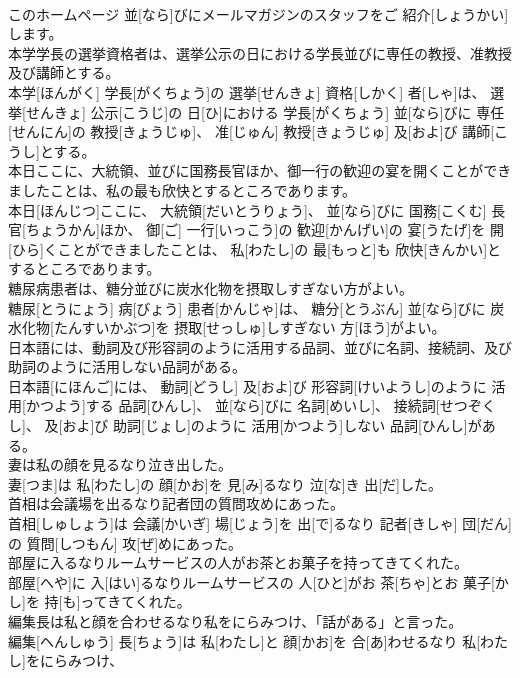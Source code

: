 \documentclass[8pt]{extreport}
\begin{document}
\begin{CJK}{UTF8}{min}
\\	このホームページ 並[なら]びにメールマガジンのスタッフをご 紹介[しょうかい]します。
\\	本学学長の選挙資格者は、選挙公示の日における学長並びに専任の教授、准教授及び講師とする。	
\\	本学[ほんがく] 学長[がくちょう]の 選挙[せんきょ] 資格[しかく] 者[しゃ]は、 選挙[せんきょ] 公示[こうじ]の 日[ひ]における 学長[がくちょう] 並[なら]びに 専任[せんにん]の 教授[きょうじゅ]、 准[じゅん] 教授[きょうじゅ] 及[およ]び 講師[こうし]とする。
\\	本日ここに、大統領、並びに国務長官ほか、御一行の歓迎の宴を開くことができましたことは、私の最も欣快とするところであります。	
\\	本日[ほんじつ]ここに、 大統領[だいとうりょう]、 並[なら]びに 国務[こくむ] 長官[ちょうかん]ほか、 御[ご] 一行[いっこう]の 歓迎[かんげい]の 宴[うたげ]を 開[ひら]くことができましたことは、 私[わたし]の 最[もっと]も 欣快[きんかい]とするところであります。
\\	糖尿病患者は、糖分並びに炭水化物を摂取しすぎない方がよい。	
\\	糖尿[とうにょう] 病[びょう] 患者[かんじゃ]は、 糖分[とうぶん] 並[なら]びに 炭水化物[たんすいかぶつ]を 摂取[せっしゅ]しすぎない 方[ほう]がよい。
\\	日本語には、動詞及び形容詞のように活用する品詞、並びに名詞、接続詞、及び助詞のように活用しない品詞がある。	
\\	日本語[にほんご]には、 動詞[どうし] 及[およ]び 形容詞[けいようし]のように 活用[かつよう]する 品詞[ひんし]、 並[なら]びに 名詞[めいし]、 接続詞[せつぞくし]、 及[およ]び 助詞[じょし]のように 活用[かつよう]しない 品詞[ひんし]がある。
\\	妻は私の顔を見るなり泣き出した。	
\\	妻[つま]は 私[わたし]の 顔[かお]を 見[み]るなり 泣[な]き 出[だ]した。
\\	首相は会議場を出るなり記者団の質問攻めにあった。	
\\	首相[しゅしょう]は 会議[かいぎ] 場[じょう]を 出[で]るなり 記者[きしゃ] 団[だん]の 質問[しつもん] 攻[ぜ]めにあった。
\\	部屋に入るなりルームサービスの人がお茶とお菓子を持ってきてくれた。	
\\	部屋[へや]に 入[はい]るなりルームサービスの 人[ひと]がお 茶[ちゃ]とお 菓子[かし]を 持[も]ってきてくれた。
\\	編集長は私と顔を合わせるなり私をにらみつけ、「話がある」と言った。	
\\	編集[へんしゅう] 長[ちょう]は 私[わたし]と 顔[かお]を 合[あ]わせるなり 私[わたし]をにらみつけ、

\end{CJK}
\end{document}
